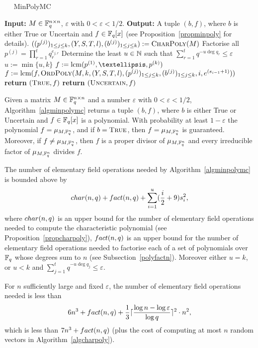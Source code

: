 \begin{algorithm}
\caption{$\quad$ \sc MinPolyMC}
\label{algminpolymc}
%
\begin{algorithmic}
\STATE \textbf{Input:} $M \in \mathbb{F}_q^{n \times n}$, $\varepsilon$ with
$0 < \varepsilon < 1/2$.
\STATE \textbf{Output:} A tuple $(b,f)$, where $b$ is either {\sc True}
or {\sc Uncertain} and $f \in \mathbb{F}_q[x]$
\STATE \hspace*{0mm}  (see
Proposition~\ref{propminpoly} for details).
\vspace*{2mm}
\STATE
       $((p^{(j)})_{1 \le j \le k},(Y,S,T,l),(b^{(j)})_{1 \le j \le k})
       := \mbox{\sc CharPoly}(M)$
\STATE Factorise all $p^{(j)} = \prod_{r=1}^t q_r^{e_{j,r}}$ 
\STATE Determine the least $u \in \mathbb{N}$ such that
 $\sum_{r=1}^t q^{-u\deg q_r} \le \varepsilon$
\STATE $u := \min\{ u,k \}$
\STATE $f := \lcm(p^{(1)}, \ldots, p^{(k)})$ 
    \STATE $f := \mathrm{lcm}(f,\mbox{\sc OrdPoly}
           (M,k,(Y,S,T,l),(p^{(j)})_{1 \le j \le k}, 
           (b^{(j)})_{1 \le j \le k},i,e^{(s_{i-1}+1)}))$
\ENDFOR
{}
    \STATE \textbf{return} $(\mbox{\sc True},f)$
\ELSE
    \STATE \textbf{return} $(\mbox{\sc Uncertain},f)$
\ENDIF
\end{algorithmic}
\end{algorithm}

\begin{Prop}\label{propminpoly}
%
Given a matrix $M \in \mathbb{F}_q^{n \times n}$ and a number
$\varepsilon$ with $0 < \varepsilon < 1/2$, Algorithm~\ref{algminpolymc}
returns a tuple $(b,f)$, where $b$ is either\/ {\sc True} or\/ {\sc Uncertain}
and $f \in \mathbb{F}_q[x]$ is a polynomial. With probability at least $1-\varepsilon$
the polynomial $f=\mu_{M,\mathbb{F}_q^n}$, and if
\/ $b = \mbox{\sc True}$, then
$f = \mu_{M,\mathbb{F}_q^n}$ is guaranteed. Moreover, 
if\/ $f \ne \mu_{M,\mathbb{F}_q^n}$, then 
$f$ is a proper divisor of $\mu_{M,\mathbb{F}_q^n}$ and
every irreducible factor of $\mu_{M,\mathbb{F}_q^n}$ divides $f$.

The number of elementary field operations needed by 
Algorithm~\ref{algminpolymc} is bounded above by
\[ 
{\rm char}(n,q) + {\rm fact}(n,q) + 
  \sum_{i=1}^u (\frac{i}{2}+9)s_i^2,
\]
where ${\rm char}(n,q)$ is an upper bound for the number of elementary field operations needed to
compute the characteristic polynomial (see
Proposition~\ref{propcharpoly}), ${\rm fact}(n,q)$ is an upper bound for 
the number of elementary field
operations needed to factorise each of a set of polynomials over $\mathbb{F}_q$ whose degrees sum to $n$
(see Subsection~{\rm\ref{polyfactn}}). Moreover either $u=k$, or $u<k$ and
$\sum_{j=1}^t q^{-u\deg q_j} \le \varepsilon$.

For $n$ sufficiently large and fixed $\varepsilon$, the number of
elementary field operations needed is less than
\[ 6n^3 + {\rm fact}(n,q) + 
\frac{1}{3} \lceil\frac{\log n-\log \varepsilon}{\log q}\rceil^2 \cdot n^2,
\]
which is less than $7n^3 + {\rm fact}(n,q)$ (plus the cost of computing at most $n$ random 
vectors in Algorithm~\ref{algcharpoly}).
\end{Prop}


